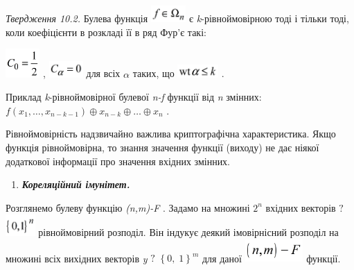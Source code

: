 \textit{Твердження 10.2}\textit{. }Булева функція 
\includegraphics[width=0.528in,height=0.25in]{crypt-img/crypt-img203.png}  є
\textit{k}{}-рівноймовірною\textit{ }тоді і тільки тоді, коли коефіцієнти в
розкладі її в ряд Фур’є такі:

{\centering
 \includegraphics[width=0.5138in,height=0.4307in]{crypt-img/crypt-img204.png} , 
 \includegraphics[width=0.5138in,height=0.25in]{crypt-img/crypt-img205.png} 
для всіх  $\alpha $\textit{ }таких, що 
\includegraphics[width=0.611in,height=0.1937in]{crypt-img/crypt-img206.png} .
\par}

Приклад \textit{k}{}-рівноймовірної булевої\textit{
}\textit{n}\textit{{}-}\textit{f}  функції від \textit{n}\textit{ }змінних: 
$f(x_{1},\dots,x_{n-k-1}){\oplus}x_{n-k}{\oplus}\dots{\oplus}x_n$
.

Рівноймовірність надзвичайно важлива криптографічна характеристика. Якщо функція
рівноймовірна, то знання значення функції  (виходу) не дає ніякої додаткової
інформації про значення вхідних змінних.  


\bigskip

\liststyleWWviiiNumxxix
\setcounter{saveenum}{\value{enumi}}
\begin{enumerate}
\setcounter{enumi}{\value{saveenum}}
\item {\bfseries\itshape
Кореляційний імунітет.}
\end{enumerate}
Розглянемо булеву функцію
\textit{(}\textit{n}\textit{,}\textit{m}\textit{)-}\textit{F}  . Задамо на
множині  $2^n$ вхідних векторів \textitx $?$
\includegraphics[width=0.4437in,height=0.3193in]{crypt-img/crypt-img207.png} 
рівноймовірний розподіл. Він індукує деякий імовірнісний розподіл на множині
всіх вихідних векторів \textit{y} $?$ $\left\{ 0,\;1 \right\}^m$ для
даної 
\includegraphics[width=0.8744in,height=0.3425in]{crypt-img/crypt-img208.png} 
функції.


